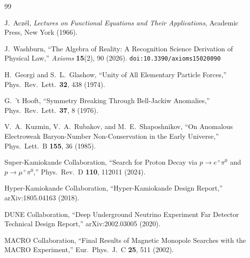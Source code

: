 \documentclass[12pt,a4paper]{article}
\theoremstyle{definition}
\theoremstyle{remark}
\begin{document}
\begin{thebibliography}{99}

J.~Acz\'el, \emph{Lectures on Functional Equations and Their Applications},
Academic Press, New York (1966).

J.~Washburn, ``The Algebra of Reality: A Recognition Science Derivation
of Physical Law,'' \emph{Axioms} \textbf{15}(2), 90 (2026).
\texttt{doi:10.3390/axioms15020090}

H.~Georgi and S.~L.~Glashow, ``Unity of All Elementary
Particle Forces,'' Phys.\ Rev.\ Lett.\ \textbf{32}, 438
(1974).

G.~'t Hooft, ``Symmetry Breaking Through Bell-Jackiw
Anomalies,'' Phys.\ Rev.\ Lett.\ \textbf{37}, 8 (1976).

V.~A.~Kuzmin, V.~A.~Rubakov, and M.~E.~Shaposhnikov,
``On Anomalous Electroweak Baryon-Number Non-Conservation
in the Early Universe,'' Phys.\ Lett.\ B \textbf{155},
36 (1985).

Super-Kamiokande Collaboration, ``Search for Proton Decay
via $p \to e^+\pi^0$ and $p \to \mu^+\pi^0$,'' Phys.\
Rev.\ D \textbf{110}, 112011 (2024).

Hyper-Kamiokande Collaboration, ``Hyper-Kamiokande Design
Report,'' arXiv:1805.04163 (2018).

DUNE Collaboration, ``Deep Underground Neutrino Experiment
Far Detector Technical Design Report,'' arXiv:2002.03005
(2020).

MACRO Collaboration, ``Final Results of Magnetic Monopole
Searches with the MACRO Experiment,'' Eur.\ Phys.\ J.\ C
\textbf{25}, 511 (2002).

\end{thebibliography}
\end{document}
